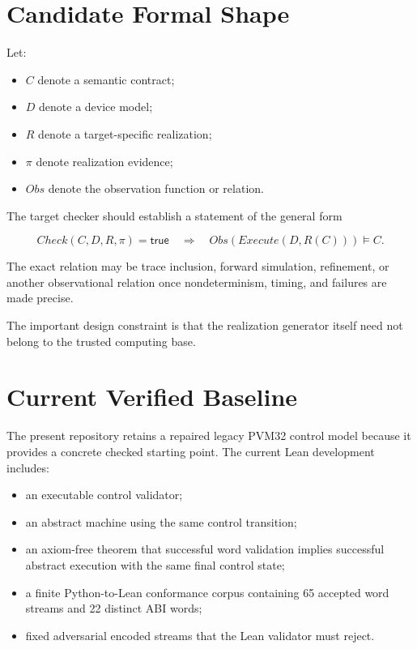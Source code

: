 \documentclass[11pt,a4paper]{article}
\begin{document}
\section{Candidate Formal Shape}

Let:
\begin{itemize}
\item $C$ denote a semantic contract;
\item $D$ denote a device model;
\item $R$ denote a target-specific realization;
\item $\pi$ denote realization evidence;
\item $Obs$ denote the observation function or relation.
\end{itemize}

The target checker should establish a statement of the general form

\[
  Check(C,D,R,\pi)=\mathsf{true}
  \quad\Longrightarrow\quad
  Obs(Execute(D,R(C))) \models C.
\]

The exact relation may be trace inclusion, forward simulation, refinement, or
another observational relation once nondeterminism, timing, and failures are
made precise.

The important design constraint is that the realization generator itself need
not belong to the trusted computing base.

\section{Current Verified Baseline}

The present repository retains a repaired legacy PVM32 control model because it
provides a concrete checked starting point. The current Lean development
includes:
\begin{itemize}
\item an executable control validator;
\item an abstract machine using the same control transition;
\item an axiom-free theorem that successful word validation implies successful
      abstract execution with the same final control state;
\item a finite Python-to-Lean conformance corpus containing 65 accepted word
      streams and 22 distinct ABI words;
\item fixed adversarial encoded streams that the Lean validator must reject.
\end{itemize}
\end{document}
